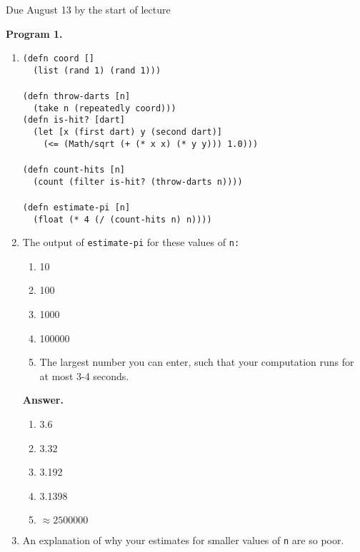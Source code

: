 \documentclass[9pt]{article}
\begin{document}
\noindent Due August 13 by the start of lecture

\textbf{Program 1.}
\begin{enumerate}
   \item \verb|(defn coord []| \\
         \verb|  (list (rand 1) (rand 1)))| \\ \\
  
         \verb|(defn throw-darts [n]| \\
         \verb|  (take n (repeatedly coord)))| \\
  
         \verb|(defn is-hit? [dart]| \\
         \verb|  (let [x (first dart) y (second dart)]| \\
         \verb|    (<= (Math/sqrt (+ (* x x) (* y y))) 1.0)))| \\ \\
    
         \verb|(defn count-hits [n]| \\
         \verb|  (count (filter is-hit? (throw-darts n))))| \\ \\
  
         \verb|(defn estimate-pi [n]| \\
         \verb|  (float (* 4 (/ (count-hits n) n))))|
   \item The output of \verb|estimate-pi| for these values of \verb|n:|

         \begin{enumerate}
            \item 10
            \item 100
            \item 1000
            \item 100000
            \item The largest number you can enter, such that your computation
                  runs for at most 3-4 seconds.
         \end{enumerate}
         
      \textbf{Answer.}
      
      \begin{enumerate}      
         \item 3.6
         \item 3.32
         \item 3.192
         \item 3.1398
         \item $\approx 2500000$
      \end{enumerate}
   \item An explanation of why your estimates for smaller values of \verb|n| are
         so poor.


\end{enumerate}
\end{document}
